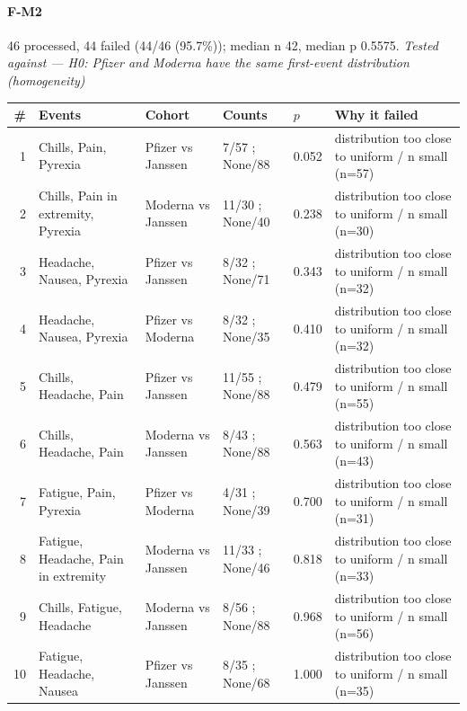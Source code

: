 \documentclass[11pt]{article}
\begin{document}
\paragraph{F-M2} 46 processed, 44 failed (44/46 (95.7\%)); median n 42, median p 0.5575. \emph{Tested against --- H0: Pfizer and Moderna have the same first-event distribution (homogeneity)} \\
\begin{longtable}{@{}r p{3.9cm} p{2.5cm} l l p{4.4cm}@{}}
\toprule
\# & Events & Cohort & Counts & $p$ & Why it failed \\
\midrule \endhead
1 & Chills, Pain, Pyrexia & Pfizer vs Janssen & 7/57 ; None/88 & 0.052 & distribution too close to uniform / n small (n=57) \\
2 & Chills, Pain in extremity, Pyrexia & Moderna vs Janssen & 11/30 ; None/40 & 0.238 & distribution too close to uniform / n small (n=30) \\
3 & Headache, Nausea, Pyrexia & Pfizer vs Janssen & 8/32 ; None/71 & 0.343 & distribution too close to uniform / n small (n=32) \\
4 & Headache, Nausea, Pyrexia & Pfizer vs Moderna & 8/32 ; None/35 & 0.410 & distribution too close to uniform / n small (n=32) \\
5 & Chills, Headache, Pain & Pfizer vs Janssen & 11/55 ; None/88 & 0.479 & distribution too close to uniform / n small (n=55) \\
6 & Chills, Headache, Pain & Moderna vs Janssen & 8/43 ; None/88 & 0.563 & distribution too close to uniform / n small (n=43) \\
7 & Fatigue, Pain, Pyrexia & Pfizer vs Moderna & 4/31 ; None/39 & 0.700 & distribution too close to uniform / n small (n=31) \\
8 & Fatigue, Headache, Pain in extremity & Moderna vs Janssen & 11/33 ; None/46 & 0.818 & distribution too close to uniform / n small (n=33) \\
9 & Chills, Fatigue, Headache & Moderna vs Janssen & 8/56 ; None/88 & 0.968 & distribution too close to uniform / n small (n=56) \\
10 & Fatigue, Headache, Nausea & Pfizer vs Janssen & 8/35 ; None/68 & 1.000 & distribution too close to uniform / n small (n=35) \\
\bottomrule
\end{longtable}
\end{document}
